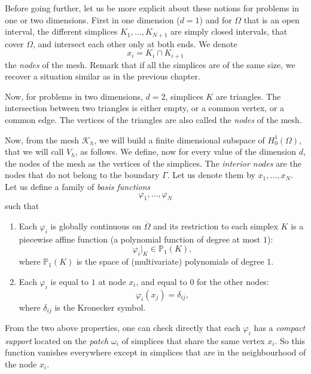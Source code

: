 \documentclass{article}
\begin{document}
Before going further, let us be more explicit about these notions for problems in one or two dimensions. First in one dimension ($d=1$) and for $\Omega$ that is an open interval, the different simplices $K_1,\ldots,K_{N+1}$ are simply closed intervals, that cover $\Omega$, and intersect each other only at both ends. We denote \[x_i = K_i \cap K_{i+1}\] the \emph{nodes} of the mesh. Remark that if all the simplices are of the same size, we recover a situation similar as in the previous chapter.

Now, for problems in two dimensions, $d=2$, simplices $K$ are triangles. The intersection between two triangles is either empty, or a common vertex, or a common edge. The vertices of the triangles are also called the \emph{nodes} of the mesh.

Now, from the mesh $\mathcal{K}_h$, we will build a finite dimensional subspace of $H^1_0(\Omega)$, that we will call $V_h$, as follows. We define, now for every value of the dimension $d$, the nodes of the mesh as the vertices of the simplices. The \emph{interior nodes} are the nodes that do not belong to the boundary $\Gamma$. Let us denote them by $x_1,\ldots,x_N$. Let us define a family of \emph{basis functions} \[\varphi_1,\ldots,\varphi_N\] such that
\begin{enumerate}
    \item Each $\varphi_i$ is globally continuous on $\overline{\Omega}$ and its restriction to each simplex $K$ is a piecewise affine function (a polynomial function of degree at most $1$):
    \[
    \varphi_i|_K \in \mathbb{P}_1(K),
    \]
    where $\mathbb{P}_1(K)$ is the space of (multivariate) polynomials of degree 1.
    \item Each $\varphi_i$ is equal to $1$ at node $x_i$, and equal to $0$ for the other nodes:
    \[
    \varphi_i(x_j) = \delta_{ij},
    \]
    where $\delta_{ij}$ is the Kronecker symbol.
\end{enumerate}

From the two above properties, one can check directly that each $\varphi_i$ has a \emph{compact support} located on the \emph{patch} $\omega_i$ of simplices that share the same vertex $x_i$. So this function vanishes everywhere except in simplices that are in the neighbourhood of the node $x_i$.
\end{document}
